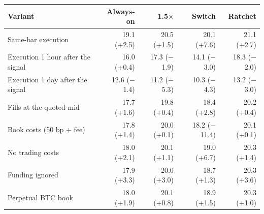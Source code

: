 \begin{tabular}{@{}lrrrr@{}}
\toprule
Variant & Always-on & 1.5$\times$ & Switch & Ratchet \\
\midrule
Same-bar execution & 19.1 (+2.5) & 20.5 (+1.5) & 20.1 (+7.6) & 21.1 (+2.7) \\
Execution 1 hour after the signal & 16.0 (+0.4) & 17.3 (\ensuremath{-}1.9) & 14.1 (\ensuremath{-}3.0) & 18.3 (\ensuremath{-}2.0) \\
Execution 1 day after the signal & 12.6 (\ensuremath{-}1.4) & 11.2 (\ensuremath{-}5.3) & 10.3 (\ensuremath{-}4.3) & 13.2 (\ensuremath{-}3.0) \\
Fills at the quoted mid & 17.7 (+1.6) & 19.8 (+0.4) & 18.4 (+2.8) & 20.2 (+0.4) \\
Book costs (50 bp + fee) & 17.8 (+1.4) & 20.0 (+0.1) & 18.2 (\ensuremath{-}11.4) & 20.1 (+0.1) \\
No trading costs & 18.0 (+2.1) & 20.1 (+1.1) & 19.0 (+6.7) & 20.3 (+1.4) \\
Funding ignored & 17.9 (+3.3) & 20.0 (+3.0) & 18.7 (+1.3) & 20.3 (+3.6) \\
Perpetual BTC book & 18.0 (+1.9) & 20.1 (+0.8) & 18.9 (+1.5) & 20.3 (+1.0) \\
\bottomrule
\end{tabular}
